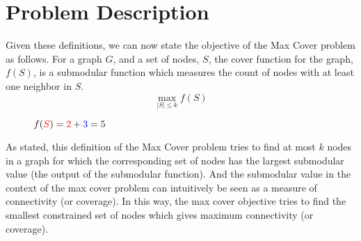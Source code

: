 \documentclass[11pt, a4paper]{article}
\begin{document}
\section{Problem Description} %
Given these definitions, we can now state the objective of  the Max Cover problem as follows. For a graph $G$, and a set of nodes, $S$, the cover function for the graph, $f(S)$, is a submodular function which measures the count of nodes with at least one neighbor in $S$. 
\begin{equation}
    \max _{|S| \leq k} f(S)
\end{equation}

\begin{figure}[H]
\centering

\caption*{$f(\textcolor{red}{S}) = \textcolor{red}{2} + \textcolor{blue}{3} = 5$}
\end{figure}

As stated, this definition of the Max Cover problem tries to find at most $k$ nodes in a graph for which the corresponding set of nodes has the largest submodular value (the output of the submodular function). And the submodular value in the context of the max cover problem can intuitively be seen as a measure of connectivity (or coverage). In this way, the max cover objective tries to find the smallest constrained set of nodes which gives maximum connectivity (or coverage).
 
\end{document}
